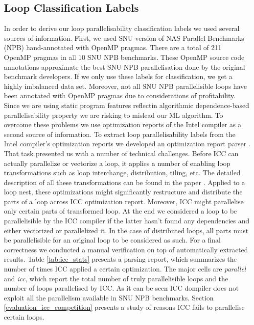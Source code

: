 \documentclass[sigconf,10pt,review,anonymous]{acmart}
\begin{document}
\subsection{Loop Classification Labels}
\label{loop_classification_labels}
\quad In order to derive our loop parallelisability classification labels we used several sources of information. First, we used SNU version \cite{snu-npb-benchmarks} of NAS Parallel Benchmarks (NPB) \cite{nasa-parallel-benchmarks} hand-annotated with OpenMP pragmas. There are a total of 211 OpenMP pragmas in all 10 SNU NPB benchmarks. These OpenMP source code annotations approximate the best SNU NPB parallelisation done by the original benchmark developers.\newline\null
\quad If we only use these labels for classification, we get a highly imbalanced data set. 
Moreover, not all SNU NPB parallelisible loops have been annotated with OpenMP pragmas due to considerations of profitability. Since we are using static program features reflectin algorithmic dependence-based parallelisability property we are risking to mislead our ML algorithm. To overcome these problems we use optimization reports of the Intel compiler as a second source of information.\newline\null
\quad To extract loop parallelisability labels from the Intel compiler's optimization reports we developed an optimization report parser \cite{github-icc-parser}. That task presented us with a number of technical challenges. Before ICC can actually parallelize or vectorize a loop, it applies a number of enabling loop transformations such as loop interchange, distribution, tiling, etc. The detailed description of all these transformations can be found in the paper \cite{Bacon:1994:CTH:197405.197406}. Applied to a loop nest, these optimizations might significantly restructure and distribute the parts of a loop across ICC optimization report. Moreover, ICC might parallelise only certain parts of transformed loop. At the end we considered a loop to be parallelisible by the ICC compiler if the latter hasn't found any dependencies and either vectorized or parallelized it. In the case of distributed loops, all parts must be parallelisible for an original loop to be considered as such. For a final correctness we conducted a manual verification on top of automatically extracted results.\newline\null
\quad Table \ref{tab:icc_stats} presents a parsing report, which summarizes the number of times ICC applied a certain optimization. The major cells are \textit{parallel} and \textit{icc}, which report the total number of truly parallelisible loops and the number of loops parallelised by ICC. As it can be seen ICC dompiler does not exploit all the parallelism available in SNU NPB benchmarks. Section \ref{evaluation_icc_competition} presents a study of reasons ICC fails to parallelise certain loops. 
\end{document}
